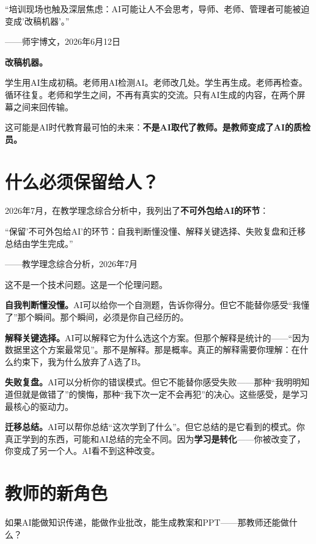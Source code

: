 \begin{shiyu-inline}
``培训现场也触及深层焦虑：AI可能让人不会思考，导师、老师、管理者可能被迫变成'改稿机器'。''

\hfill ——师宇博文，2026年6月12日
\end{shiyu-inline}

\textbf{改稿机器。}

学生用AI生成初稿。老师用AI检测AI。老师改几处。学生再生成。老师再检查。循环往复。老师和学生之间，不再有真实的交流。只有AI生成的内容，在两个屏幕之间来回传输。

这可能是AI时代教育最可怕的未来：\textbf{不是AI取代了教师。是教师变成了AI的质检员。}

\section{什么必须保留给人？}

2026年7月，在教学理念综合分析中，我列出了\textbf{不可外包给AI的环节}：

\begin{shiyu-inline}
``保留'不可外包给AI'的环节：自我判断懂没懂、解释关键选择、失败复盘和迁移总结由学生完成。''

\hfill ——教学理念综合分析，2026年7月
\end{shiyu-inline}

这不是一个技术问题。这是一个伦理问题。

\textbf{自我判断懂没懂。}AI可以给你一个自测题，告诉你得分。但它不能替你感受``我懂了''那个瞬间。那个瞬间，必须是你自己经历的。

\textbf{解释关键选择。}AI可以解释它为什么选这个方案。但那个解释是统计的——``因为数据里这个方案最常见''。那不是解释。那是概率。真正的解释需要你理解：在什么约束下，我为什么放弃了A选了B。

\textbf{失败复盘。}AI可以分析你的错误模式。但它不能替你感受失败——那种``我明明知道但就是做错了''的懊悔，那种``我下次一定不会再犯''的决心。这些感受，是学习最核心的驱动力。

\textbf{迁移总结。}AI可以帮你总结``这次学到了什么''。但它总结的是它看到的模式。你真正学到的东西，可能和AI总结的完全不同。因为\textbf{学习是转化}——你被改变了，你变成了另一个人。AI看不到这种改变。

\section{教师的新角色}

如果AI能做知识传递，能做作业批改，能生成教案和PPT——那教师还能做什么？

